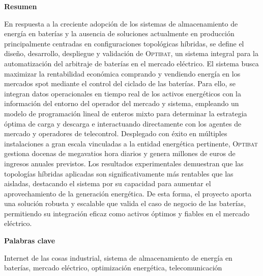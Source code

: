 \newpage

\thispagestyle{empty}

\begin{center}
  {\bf \huge Resumen}
\end{center}

\vspace{1cm}

En respuesta a la creciente adopción de los sistemas de almacenamiento de energía en baterías y la ausencia de soluciones actualmente en producción principalmente centradas en configuraciones topológicas híbridas, se define el diseño, desarrollo, despliegue y validación de \textsc{Optibat}, un sistema integral para la automatización del arbitraje de baterías en el mercado eléctrico. El sistema busca maximizar la rentabilidad económica comprando y vendiendo energía en los mercados spot mediante el control del ciclado de las baterías. Para ello, se integran datos operacionales en tiempo real de los activos energéticos con la información del entorno del operador del mercado y sistema, empleando un modelo de programación lineal de enteros mixto para determinar la estrategia óptima de carga y descarga e interactuando directamente con los agentes de mercado y operadores de telecontrol. Desplegado con éxito en múltiples instalaciones a gran escala vinculadas a la entidad energética pertinente, \textsc{Optibat} gestiona docenas de megavatios hora diarios y genera millones de euros de ingresos anuales previstos. Los resultados experimentales demuestran que las topologías híbridas aplicadas son significativamente más rentables que las aisladas, destacando el sistema por su capacidad para aumentar el aprovechamiento de la generación energética. De esta forma, el proyecto aporta una solución robusta y escalable que valida el caso de negocio de las baterías, permitiendo su integración eficaz como activos óptimos y fiables en el mercado eléctrico.

\vspace{1cm}

\begin{center}
  {\bf \large Palabras clave}
\end{center}

\vspace{0.5cm}

Internet de las cosas industrial, sistema de almacenamiento de energía en baterías, mercado eléctrico, optimización energética, telecomunicación

\newpage

\thispagestyle{empty}

